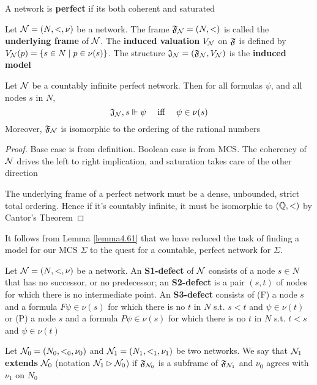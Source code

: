 \documentclass[11pt]{article}
\begin{document}
A network is \textbf{perfect} if its both coherent and saturated

\begin{definition}[]
Let \(\mathcal{N}=(N,<,\nu)\) be a network. The frame \(\mathfrak{F}_{\mathcal{N}}=(N,<)\) is called
the \textbf{underlying frame} of \(\mathcal{N}\). The \textbf{induced valuation} \(V_{\mathcal{N}}\) on
\(\mathfrak{F}\) is defined by \(V_{\mathcal{N}}(p)=\{s\in N\mid p\in\nu(s)\}\). The
structure \(\mathfrak{J}_{\mathcal{N}}=(\mathfrak{F}_{\mathcal{N}},V_{\mathcal{N}})\) is the \textbf{induced model}
\end{definition}

\begin{lemma}
\label{lemma4.61}
Let \(\mathcal{N}\) be a countably infinite perfect network. Then for all formulas
\(\psi\), and all nodes \(s\) in \(N\),
\begin{equation*}
\mathfrak{J}_{\mathcal{N}},s\Vdash\psi \quad\text{ iff }\quad
\psi\in\nu(s)
\end{equation*}
Moreover, \(\mathfrak{F}_{\mathcal{N}}\) is isomorphic to the ordering of the rational numbers
\end{lemma}

\begin{proof}
Base case is from definition. Boolean case is from MCS.
The coherency of \(\mathcal{N}\) drives the left to right implication, and
saturation takes care of the other direction

The underlying frame of a perfect network must be a dense, unbounded, strict
total ordering. Hence if it's countably infinite, it must be isomorphic to
\((\mathbb{Q},<)\) by Cantor's Theorem
\end{proof}

It follows from Lemma \ref{lemma4.61} that we have reduced the task of finding a
model for our MCS \(\Sigma\) to the quest for a countable, perfect network for \(\Sigma\).


\begin{definition}[]
Let \(\mathcal{N}=(N,<,\nu)\) be a network. An \textbf{S1-defect} of \(\mathcal{N}\) consists of a
node \(s\in N\) that  has no successor, or no predecessor; an \textbf{S2-defect} is a
pair \((s,t)\) of nodes for which there is no intermediate point. An
\textbf{S3-defect} consists of (F) a node \(s\) and a formula \(F\psi\in\nu(s)\) for
which there is no \(t\) in \(N\) s.t. \(s<t\) and \(\psi\in\nu(t)\) or (P) a
node \(s\) and a formula \(P\psi\in\nu(s)\) for which there is no \(t\) in
\(N\) s.t. \(t<s\) and \(\psi\in\nu(t)\)
\end{definition}

\begin{definition}[]
Let \(\mathcal{N}_0=(N_0,<_0,\nu_0)\) and \(\mathcal{N}_1=(N_1,<_1,\nu_1)\) be two
networks. We say that \(\mathcal{N}_1\) \textbf{extends} \(\mathcal{N}_0\) (notation
\(\mathcal{N}_1\rhd\mathcal{N}_0\)) if \(\mathfrak{F}_{\mathcal{N}_0}\) is a subframe of
\(\mathfrak{F}_{\mathcal{N}_1}\) and \(\nu_0\) agrees with \(\nu_1\) on \(N_0\)
\end{definition}
\end{document}
